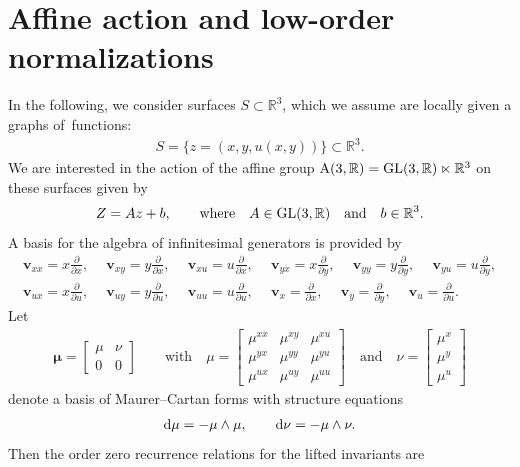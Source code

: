 \documentclass[10pt,a4paper]{amsart}
\numberwithin{equation}{section}
\newcommand{\bmu}{\boldsymbol{\mu}}
\newcommand{\pp}[2]{\frac{\partial #1}{\partial #2}}
\newcommand{\vv}{\mathbf{v}}
\begin{document}
\section{Affine action and low-order normalizations}\label{sec:low-order normalizations}

In the following, we consider surfaces $S\subset \mathbb{R}^3$, which we assume are locally given a graphs of~functions:
\begin{gather*}
S = \{z=(x,y,u(x,y))\} \subset \mathbb{R}^3.
\end{gather*}
We are interested in the action of the affine group ${\rm A}(3,\mathbb{R}) = {\rm GL}(3,\mathbb{R})\ltimes \mathbb{R}^3$ on these surfaces given by
\begin{gather*}
Z = Az+b,\qquad\text{where}\quad A\in {\rm GL}(3,\mathbb{R})\quad\text{and}\quad b\in \mathbb{R}^3.
\end{gather*}
A basis for the algebra of infinitesimal generators is provided by
%
\begin{gather*}
\vv_{xx} = x\pp{}{x},\quad\ \vv_{xy} = y\pp{}{x},\quad\ \vv_{xu} = u \pp{}{x},\quad\ \vv_{yx} = x\pp{}{y},\quad\ \vv_{yy} = y\pp{}{y},\quad\ \vv_{yu} = u\pp{}{y},
\\
\vv_{ux} = x\pp{}{u},\quad\ \vv_{uy} = y\pp{}{u},\quad\ \vv_{uu} = u\pp{}{u},\quad\ \vv_x = \pp{}{x},\quad\ \vv_y = \pp{}{y},\quad\ \vv_u = \pp{}{u}.
\end{gather*}
%
Let
\begin{gather*}
\bmu=\begin{bmatrix}
\mu &\nu \\
0 & 0
\end{bmatrix}\qquad\text{with}\quad
\mu = \begin{bmatrix}
\mu^{xx} & \mu^{xy} & \mu^{xu} \\
\mu^{yx} & \mu^{yy} & \mu^{yu} \\
\mu^{ux} & \mu^{uy} & \mu^{uu}
\end{bmatrix}
\quad\text{and}\quad
\nu = \begin{bmatrix}
\mu^x \\ \mu^y \\ \mu^u
\end{bmatrix}
\end{gather*}
denote a basis of Maurer--Cartan forms with structure equations
\begin{gather*}
{\rm d}\mu = -\mu \wedge \mu,\qquad
{\rm d}\nu = - \mu\wedge \nu.
\end{gather*}
Then the order zero recurrence relations for the lifted invariants are
\end{document}
